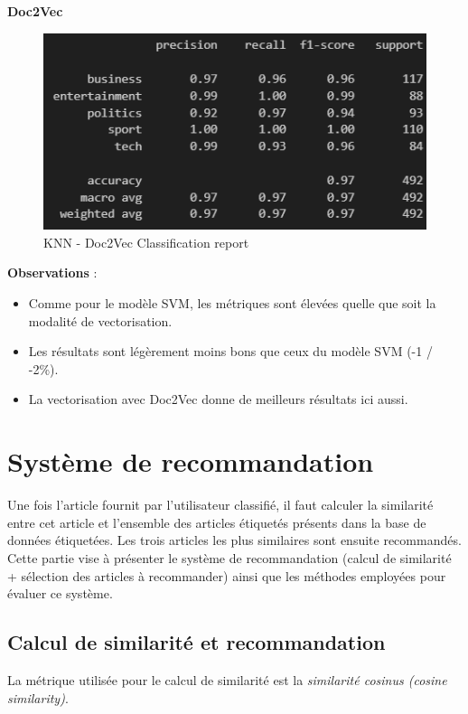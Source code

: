 \documentclass[a4paper,12pt]{article}
\begin{document}
\textbf{Doc2Vec}\\

\begin{figure}[H]
  \centering
  \includegraphics{images/knn_doc2vec.png} 
  \caption{KNN - Doc2Vec Classification report}
  \label{fig:knndoc2vec}
\end{figure}

\textbf{Observations} :
\begin{itemize}
    \item Comme pour le modèle SVM, les métriques sont élevées quelle que soit la modalité de vectorisation.
    \item Les résultats sont légèrement moins bons que ceux du modèle SVM (-1 / -2\%).
    \item La vectorisation avec Doc2Vec donne de meilleurs résultats ici aussi.
\end{itemize}


\section{Système de recommandation}

Une fois l'article fournit par l'utilisateur classifié, il faut calculer la similarité entre cet article et l'ensemble des articles étiquetés présents dans la base de données étiquetées. Les trois articles les plus similaires sont ensuite recommandés.\\

Cette partie vise à présenter le système de recommandation (calcul de similarité + sélection des articles à recommander) ainsi que les méthodes employées pour évaluer ce système.

\subsection{Calcul de similarité et recommandation}

La métrique utilisée pour le calcul de similarité est la \textit{similarité cosinus (cosine similarity)}.\\
\end{document}
